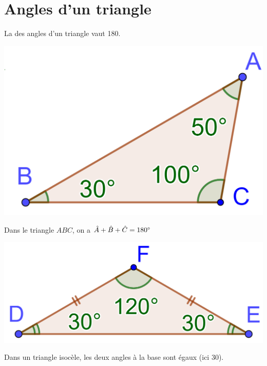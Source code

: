\documentclass[xcolor={dvipsnames}]{beamer}
\begin{document}

\section{Angles d'un triangle}

\begin{frame}
	\begin{myprop}
		La  des angles d'un triangle vaut 180\degree.\pause
	\end{myprop}


	\begin{myex}
		\begin{center}
			\includegraphics[scale=0.22]{quelconque}\pause
		\end{center}
	
		Dans le triangle $ABC$, on a \pause $\hat{A} + \hat{B} + \hat{C} = 180\degree$
	\end{myex}
\end{frame}

\begin{frame}
	\begin{myex}
		\begin{center}
			\includegraphics[scale=0.22]{isocele}\pause
		\end{center}
		
		Dans un triangle isocèle, \pause les deux angles à la base sont égaux (ici 30\degree).
	\end{myex}
\end{frame}
\end{document}
